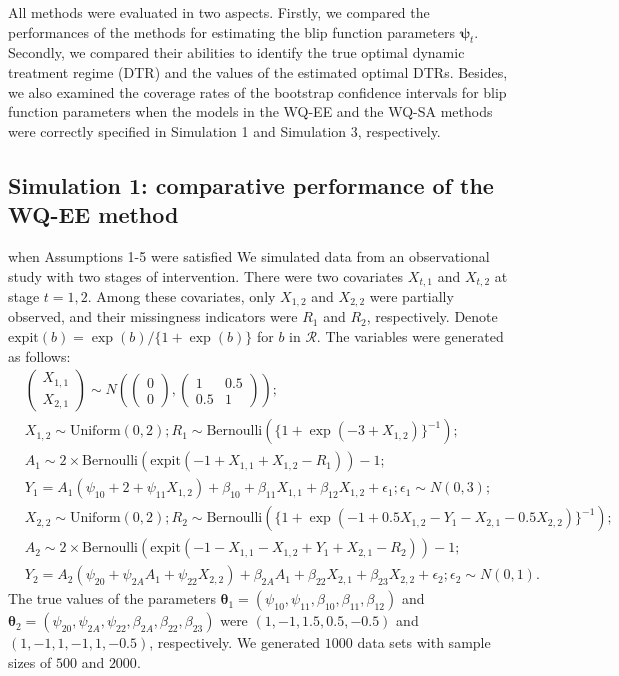 \documentclass[12pt]{article}
\begin{document}
All methods were evaluated in two aspects. Firstly, we compared the performances of the methods for estimating the blip function parameters $\bm{\psi}_t$. Secondly, we compared their abilities to identify the true optimal dynamic treatment regime (DTR) and the values of the estimated optimal DTRs. Besides, we also examined the coverage rates of the bootstrap confidence intervals for blip function parameters when the models in the WQ-EE and the WQ-SA methods were correctly specified in Simulation 1 and Simulation 3, respectively.

\subsection{Simulation 1: comparative performance of the WQ-EE method} when Assumptions 1-5 were satisfied
We simulated data from an observational study with two stages of intervention. There were two covariates $X_{t,1}$ and $X_{t,2}$ at stage $t=1,2$. Among these covariates, only $X_{1,2}$ and $X_{2,2}$ were partially observed, and their missingness indicators were $R_1$ and $R_2$, respectively.  Denote $\text{expit}(b) = \exp(b)/\{1+\exp(b)\}$ for $b$ in $\mathcal{R}$. The variables were generated as follows:
\begin{align*}
    & \left( \begin{matrix}X_{1,1}\\X_{2,1}\end{matrix}\right)  \sim N\left(\left( \begin{matrix}0\\0\end{matrix}\right), \left(  \begin{matrix}1 & 0.5\\0.5 & 1 \end{matrix}\right) \right) ;\\
    & X_{1,2} \sim \text{Uniform}(0,2); R_1  \sim \text{Bernoulli} (\{1+\exp(-3+X_{1,2})\}^{-1});\\
    & A_1  \sim 2\times \text{Bernoulli}(\text{expit}(-1+X_{1,1}+X_{1,2}-R_1)) - 1;\\
    & Y_1  =  A_1(\psi_{10}+2+\psi_{11}X_{1,2})+\beta_{10}+\beta_{11} X_{1,1} + \beta_{12} X_{1,2} + \epsilon_1 ; \epsilon_1 \sim N(0,3);\\
    & X_{2,2} \sim \text{Uniform}(0,2);  R_2 \sim  \text{Bernoulli} (\{1+\exp(-1+0.5X_{1,2}-Y_{1}-X_{2,1}-0.5X_{2,2})\}^{-1}) ; \\
    & A_2\sim 2\times \text{Bernoulli} (\text{expit}(-1-X_{1,1}-X_{1,2}+Y_1+X_{2,1}-R_2) ) - 1;\\
    & Y_2 = A_2(\psi_{20}+\psi_{2A}A_1+\psi_{22}X_{2,2}) + \beta_{2A}A_1 + \beta_{22}X_{2,1}+ \beta_{23}X_{2,2} + \epsilon_2; \epsilon_2 \sim N(0,1). 
\end{align*}
The true values of the parameters $\bm{\theta}_1 = (\psi_{10},\psi_{11},\beta_{10},\beta_{11},\beta_{12})$ and $\bm{\theta}_2=(\psi_{20},\psi_{2A},\psi_{22},\beta_{2A},\beta_{22},\beta_{23})$ were  $(1,-1,1.5,0.5,-0.5)$ and $(1,-1,1,-1,1,-0.5)$, respectively. We generated $1000$  data sets with sample sizes of $500$ and $2000$.
\end{document}
